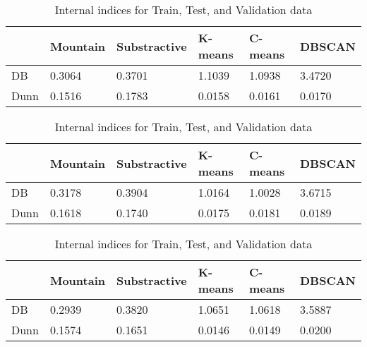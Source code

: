 \begin{table}
    \begin{tabular}{l|lllll}
        \hline & Mountain & Substractive & K-means & C-means & DBSCAN\\\hline
        DB   & 0.3064 & 0.3701 & 1.1039 & 1.0938 & 3.4720\\
        Dunn & 0.1516 & 0.1783 & 0.0158 & 0.0161 & 0.0170
    \end{tabular}
    \begin{tabular}{l|lllll}
        \hline\hline & Mountain & Substractive & K-means & C-means & DBSCAN\\\hline
        DB   & 0.3178 & 0.3904 & 1.0164 & 1.0028 & 3.6715\\
        Dunn & 0.1618 & 0.1740 & 0.0175 & 0.0181 & 0.0189
    \end{tabular}
    
    \begin{tabular}{l|lllll}
        \hline\hline & Mountain & Substractive & K-means & C-means & DBSCAN\\\hline
        DB   & 0.2939 & 0.3820 & 1.0651 & 1.0618 & 3.5887\\
        Dunn & 0.1574 & 0.1651 & 0.0146 & 0.0149 & 0.0200\\\hline 
    \end{tabular}
    \caption{Internal indices for Train, Test, and Validation data\label{tab:external}}
\end{table}



